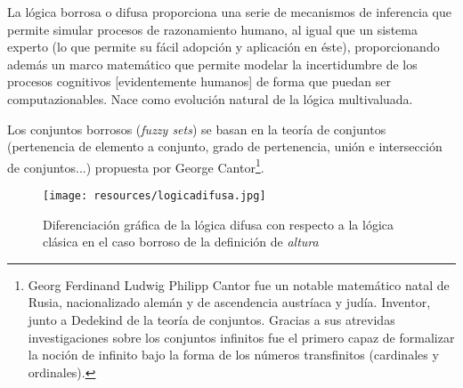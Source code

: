 \documentclass[a4paper, 11pt, titlepage]{article}
\begin{document}
    La lógica borrosa o difusa proporciona una serie de mecanismos de inferencia que permite simular 
    procesos de razonamiento humano, al igual que un sistema experto (lo que permite su 
    fácil adopción y aplicación en éste), proporcionando además un marco matemático 
    que permite modelar la incertidumbre de los procesos cognitivos [evidentemente humanos]
    de forma que puedan ser computazionables. Nace como evolución natural de la lógica multivaluada.

    Los conjuntos borrosos (\textit{fuzzy sets}) se basan en la teoría de conjuntos 
    (pertenencia de elemento a conjunto, grado de pertenencia, unión e intersección de conjuntos...)
    propuesta por 
    George Cantor\footnote{
        Georg Ferdinand Ludwig Philipp Cantor fue un notable matemático natal de Rusia, nacionalizado 
        alemán y de ascendencia austríaca y judía. Inventor, junto a Dedekind de la teoría de conjuntos.
        Gracias a sus atrevidas investigaciones sobre los conjuntos infinitos fue el primero capaz de 
        formalizar la noción de infinito bajo la forma de los números transfinitos (cardinales y ordinales). 
    }.

    \begin{figure}[htp]
        \centering
        \texttt{[image: resources/logicadifusa.jpg]}
        \caption{Diferenciación gráfica de la lógica difusa con respecto a la lógica clásica en el 
        caso borroso de la definición de \textit{altura}}
        \label{logicadifusa}
    \end{figure}
\end{document}
